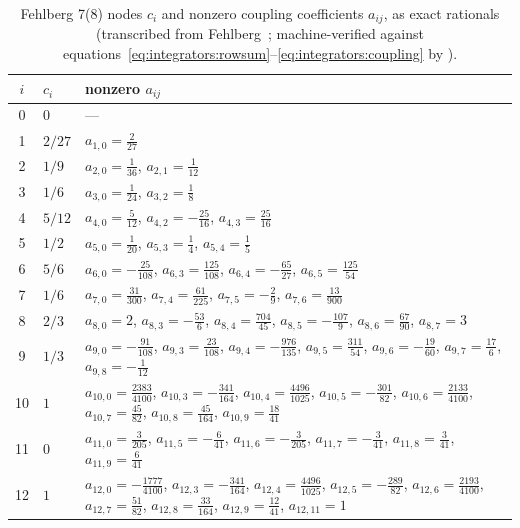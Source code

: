 \begin{table}[htbp]
  \centering
  \caption{Fehlberg 7(8) nodes $c_i$ and nonzero coupling coefficients
    $a_{ij}$, as exact rationals (transcribed from
    Fehlberg~\cite{fehlberg1968}; machine-verified against
    equations~\eqref{eq:integrators:rowsum}--\eqref{eq:integrators:coupling}
    by ).}
  \label{tab:integrators:rkf78a}
  \scriptsize
  \begin{tabular}{clp{11.2cm}}
    \toprule
    $i$ & $c_i$ & nonzero $a_{ij}$ \\
    \midrule
    0  & $0$     & --- \\
    1  & $2/27$  & $a_{1,0}=\frac{2}{27}$ \\
    2  & $1/9$   & $a_{2,0}=\frac{1}{36}$, $a_{2,1}=\frac{1}{12}$ \\
    3  & $1/6$   & $a_{3,0}=\frac{1}{24}$, $a_{3,2}=\frac{1}{8}$ \\
    4  & $5/12$  & $a_{4,0}=\frac{5}{12}$, $a_{4,2}=-\frac{25}{16}$,
                   $a_{4,3}=\frac{25}{16}$ \\
    5  & $1/2$   & $a_{5,0}=\frac{1}{20}$, $a_{5,3}=\frac{1}{4}$,
                   $a_{5,4}=\frac{1}{5}$ \\
    6  & $5/6$   & $a_{6,0}=-\frac{25}{108}$, $a_{6,3}=\frac{125}{108}$,
                   $a_{6,4}=-\frac{65}{27}$, $a_{6,5}=\frac{125}{54}$ \\
    7  & $1/6$   & $a_{7,0}=\frac{31}{300}$, $a_{7,4}=\frac{61}{225}$,
                   $a_{7,5}=-\frac{2}{9}$, $a_{7,6}=\frac{13}{900}$ \\
    8  & $2/3$   & $a_{8,0}=2$, $a_{8,3}=-\frac{53}{6}$,
                   $a_{8,4}=\frac{704}{45}$, $a_{8,5}=-\frac{107}{9}$,
                   $a_{8,6}=\frac{67}{90}$, $a_{8,7}=3$ \\
    9  & $1/3$   & $a_{9,0}=-\frac{91}{108}$, $a_{9,3}=\frac{23}{108}$,
                   $a_{9,4}=-\frac{976}{135}$, $a_{9,5}=\frac{311}{54}$,
                   $a_{9,6}=-\frac{19}{60}$, $a_{9,7}=\frac{17}{6}$,
                   $a_{9,8}=-\frac{1}{12}$ \\
    10 & $1$     & $a_{10,0}=\frac{2383}{4100}$, $a_{10,3}=-\frac{341}{164}$,
                   $a_{10,4}=\frac{4496}{1025}$, $a_{10,5}=-\frac{301}{82}$,
                   $a_{10,6}=\frac{2133}{4100}$, $a_{10,7}=\frac{45}{82}$,
                   $a_{10,8}=\frac{45}{164}$, $a_{10,9}=\frac{18}{41}$ \\
    11 & $0$     & $a_{11,0}=\frac{3}{205}$, $a_{11,5}=-\frac{6}{41}$,
                   $a_{11,6}=-\frac{3}{205}$, $a_{11,7}=-\frac{3}{41}$,
                   $a_{11,8}=\frac{3}{41}$, $a_{11,9}=\frac{6}{41}$ \\
    12 & $1$     & $a_{12,0}=-\frac{1777}{4100}$, $a_{12,3}=-\frac{341}{164}$,
                   $a_{12,4}=\frac{4496}{1025}$, $a_{12,5}=-\frac{289}{82}$,
                   $a_{12,6}=\frac{2193}{4100}$, $a_{12,7}=\frac{51}{82}$,
                   $a_{12,8}=\frac{33}{164}$, $a_{12,9}=\frac{12}{41}$,
                   $a_{12,11}=1$ \\
    \bottomrule
  \end{tabular}
\end{table}


